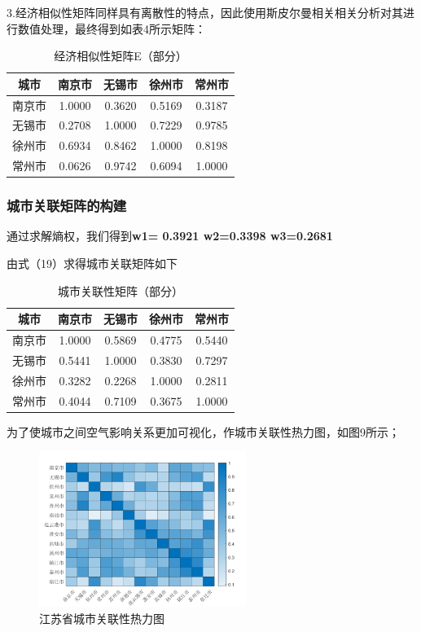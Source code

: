 \documentclass[a4paper,12pt]{article}
\begin{document}
	3.经济相似性矩阵同样具有离散性的特点，因此使用斯皮尔曼相关相关分析对其进行数值处理，最终得到如表4所示矩阵：
	
	\begin{table}[h]
		\centering
		\caption{经济相似性矩阵E（部分）}
		\begin{tabular}{ccccc}
			\toprule
			城市 & 南京市 & 无锡市 & 徐州市 & 常州市 \\
			\midrule
			南京市 & 1.0000 & 0.3620 & 0.5169 & 0.3187 \\
			无锡市 & 0.2708 & 1.0000 & 0.7229 & 0.9785 \\
			徐州市 & 0.6934 & 0.8462 & 1.0000 & 0.8198 \\
			常州市 & 0.0626 & 0.9742 & 0.6094 & 1.0000 \\
			\bottomrule
		\end{tabular}
	\end{table}
	
	\subsubsection{城市关联矩阵的构建}
	通过求解熵权，我们得到\textbf{w1= 0.3921  w2=0.3398   w3=0.2681}
	
	由式（19）求得城市关联矩阵如下
	
	\begin{table}[h]
		\centering
		\caption{城市关联性矩阵（部分）}
		\begin{tabular}{ccccc}
			\toprule
			城市 & 南京市 & 无锡市 & 徐州市 & 常州市 \\
			\midrule
			南京市 & 1.0000 & 0.5869 & 0.4775 & 0.5440 \\
			无锡市 & 0.5441 & 1.0000 & 0.3830 & 0.7297 \\
			徐州市 & 0.3282 & 0.2268 & 1.0000 & 0.2811 \\
			常州市 & 0.4044 & 0.7109 & 0.3675 & 1.0000 \\
			\bottomrule
		\end{tabular}
	\end{table}
	
	为了使城市之间空气影响关系更加可视化，作城市关联性热力图，如图9所示；
		\begin{figure}[htbp]
		\centering
		\includegraphics[width=0.6\textwidth]{heatmap.png}
		\caption{江苏省城市关联性热力图}
	\end{figure}
	
\end{document}
